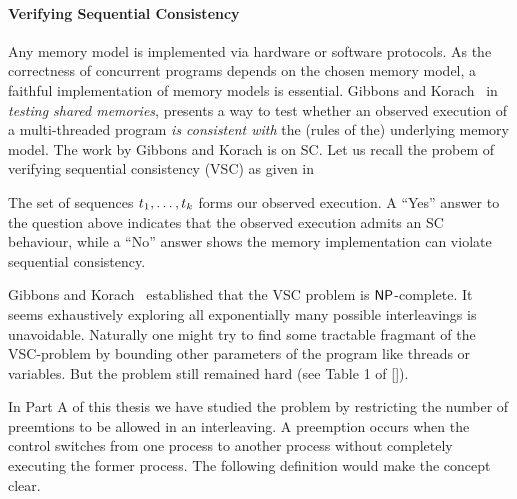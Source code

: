 \paragraph*{Verifying Sequential Consistency} Any memory model is  implemented via hardware or software protocols. As the correctness of concurrent  programs depends on the chosen memory model, a faithful implementation of memory models is essential. 
 Gibbons and Korach~\cite{gibbons} in  \emph{testing shared memories},  presents a way to test whether an observed execution of a multi-threaded program \emph{is consistent with} the (rules of the) underlying memory model. The work by Gibbons and Korach is on SC. 
Let us recall the probem of verifying sequential consistency (VSC) as given in \cite{gibbons}

\begin{center}
\end{center}

The set of sequences $t_1, \dots, t_k$ forms our observed execution. A ``Yes'' answer to the question above indicates that the observed execution admits an SC behaviour, while a ``No'' answer shows the memory implementation can violate sequential consistency.

Gibbons and Korach~\cite{gibbons} established that the VSC problem is $\mathsf{NP}$-complete. It seems exhaustively exploring all exponentially many possible interleavings is unavoidable. Naturally one might try to find some tractable fragmant of the VSC-problem by bounding other parameters of the program like threads or variables. But the problem still remained hard (see Table 1 of [\cite{gibbons}]).

In Part A of this thesis we have studied the problem by restricting the number of preemtions to be allowed in an interleaving. A preemption occurs when the control switches from one  process to another process without completely executing  the former process. The following definition would make the concept clear. 

